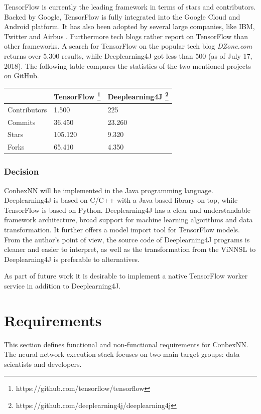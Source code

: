 TensorFlow is currently the leading framework in terms of stars and
contributors. Backed by Google, TensorFlow is fully integrated into the
Google Cloud and Android platform. It has also been adopted by several
large companies, like IBM, Twitter and Airbus \cite{dzone-frameworks}.
Furthermore tech blogs rather report on TensorFlow than other
frameworks. A search for TensorFlow on the popular tech blog
\emph{DZone.com} returns over 5.300 results, while Deeplearning4J got
less than 500 (as of July 17, 2018). The following table compares the
statistics of the two mentioned projects on GitHub.

\begin{longtable}[]{@{}lll@{}}
\toprule
& TensorFlow \footnote{https://github.com/tensorflow/tensorflow} &
Deeplearning4J \footnote{https://github.com/deeplearning4j/deeplearning4j}\tabularnewline
\midrule
\endhead
Contributors & 1.500 & 225\tabularnewline
Commits & 36.450 & 23.260\tabularnewline
Stars & 105.120 & 9.320\tabularnewline
Forks & 65.410 & 4.350\tabularnewline
\bottomrule
\end{longtable}

\subsection{Decision}\label{decision-1}

ConbexNN will be implemented in the Java programming language.
Deeplearning4J is based on C/C++ with a Java based library on top, while
TensorFlow is based on Python. Deeplearning4J has a clear and
understandable framework architecture, broad support for machine
learning algorithms and data transformation. It further offers a model
import tool for TensorFlow models. From the author's point of view, the
source code of Deeplearning4J programs is cleaner and easier to
interpret, as well as the transformation from the ViNNSL to
Deeplearning4J is preferable to alternatives.

As part of future work it is desirable to implement a native TensorFlow
worker service in addition to Deeplearning4J.

\chapter{Requirements}\label{requirements}

This section defines functional and non-functional requirements for
ConbexNN. The neural network execution stack focuses on two main target
groups: data scientists and developers.

